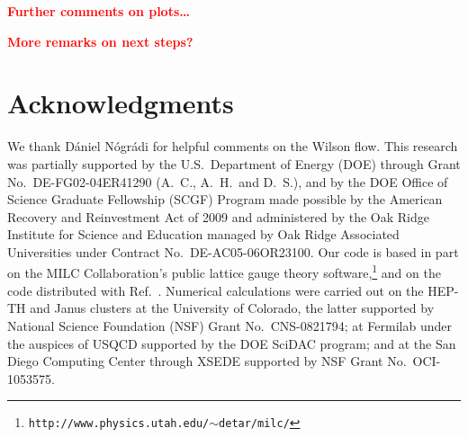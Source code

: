 \documentclass{PoS}
\newcommand{\refcite}[1]{Ref.~\cite{#1}}
\newcommand{\TODO}[1]{\textcolor{red}{{\bf #1}}}
\begin{document}
\TODO{Further comments on plots\dots}

\TODO{More remarks on next steps?}



\section*{Acknowledgments} %
We thank D\'aniel N\'ogr\'adi for helpful comments on the Wilson flow.
This research was partially supported by the U.S.~Department of Energy (DOE) through Grant No.~DE-FG02-04ER41290 (A.~C., A.~H.\ and D.~S.), and by the DOE Office of Science Graduate Fellowship (SCGF) Program made possible by the American Recovery and Reinvestment Act of 2009 and administered by the Oak Ridge Institute for Science and Education managed by Oak Ridge Associated Universities under Contract No.~DE-AC05-06OR23100.
Our code is based in part on the MILC Collaboration's public lattice gauge theory software,\footnote{\texttt{http://www.physics.utah.edu/$\sim$detar/milc/}} and on the code distributed with \refcite{Borsanyi:2012zs}.
Numerical calculations were carried out on the HEP-TH and Janus clusters at the University of Colorado, the latter supported by National Science Foundation (NSF) Grant No.~CNS-0821794; at Fermilab under the auspices of USQCD supported by the DOE SciDAC program; and at the San Diego Computing Center through XSEDE supported by NSF Grant No.~OCI-1053575.



\end{document}
